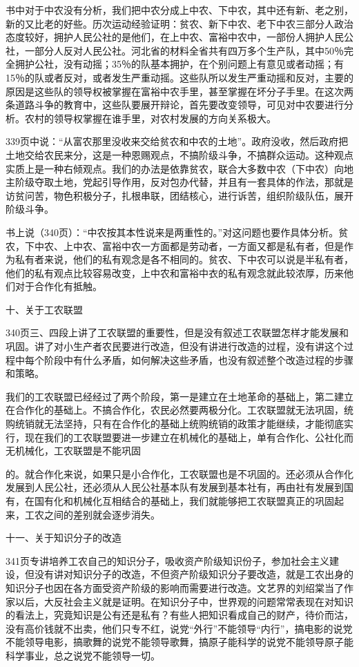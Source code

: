 书中对于中农没有分析，我们把中农分成上中农、下中农，其中还有新、老之别，新的又比老的好些。历次运动经验证明：贫农、新下中农、老下中农三部分人政治态度较好，拥护人民公社的是他们，在上中农、富裕中农中，一部份人拥护人民公社，一部分人反对人民公社。河北省的材料全省共有四万多个生产队，其中50％完全拥护公社，没有动摇；35％的队基本拥护，在个别问题上有意见或者动摇；有15％的队或者反对，或者发生严重动摇。这些队所以发生严重动摇和反对，主要的原因是这些队的领导权被掌握在富裕中农手里，甚至掌握在坏分子手里。在这次两条道路斗争的教育中，这些队要展开辩论，首先要改变领导，可见对中农要进行分析。农村的领导权掌握在谁手里，对农村发展的方向关系极大。

339页中说：“从富农那里没收来交给贫农和中农的土地”。政府没收，然后政府把土地交给农民来分，这是一种恩赐观点，不搞阶级斗争，不搞群众运动。这种观点实质上是一种右倾观点。我们的办法是依靠贫农，联合大多数中农（下中农）向地主阶级夺取土地，党起引导作用，反对包办代替，并且有一套具体的作法，那就是访贫问苦，物色积极分子，扎根串联，团结核心，进行诉苦，组织阶级队伍，展开阶级斗争。

书上说（340页）：“中农按其本性说来是两重性的。”对这问题也要作具体分析。贫农，下中农、上中农、富裕中农一方面都是劳动者，一方面又都是私有者，但是作为私有者来说，他们的私有观念是各不相同的。贫农、下中农可以说是半私有者，他们的私有观点比较容易改变，上中农和富裕中衣的私有观念就此较浓厚，历来他们对于合作化有抵触。

十、关于工农联盟

340页三、四段上讲了工农联盟的重要性，但是没有叙述工农联盟怎样才能发展和巩固。讲了对小生产者农民要进行改造，但没有讲进行改造的过程，没有讲这个过程中每个阶段中有什么矛盾，如何解决这些矛盾，也没有叙述整个改造过程的步骤和策略。

我们的工农联盟已经经过了两个阶段，第一是建立在土地革命的基础上，第二建立在合作化的基础上。不搞合作化，农民必然要两极分化。工农联盟就无法巩固，统购统销就无法坚持，只有在合作化的基础上统购统销的政策才能继续，才能彻底实行，现在我们的工农联盟要进一步建立在机械化的基础上，单有合作化、公社化而无机械化，工农联盟是不能巩固

的。就合作化来说，如果只是小合作化，工农联盟也是不巩固的。还必须从合作化发展到人民公社，还必须从人民公社基本队有发展到基本社有，再由社有发展到国有，在国有化和机械化互相结合的基础上，我们就能够把工农联盟真正的巩固起来，工农之间的差别就会逐步消失。

十一、关于知识分子的改造

341页专讲培养工农自己的知识分子，吸收资产阶级知识份子，参加社会主义建设，但没有讲对知识分子的改造，不但资产阶级知识分子要改造，就是工农出身的知识分子也因在各方面受资产阶级的影响而需要进行改造。文艺界的刘绍棠当了作家以后，大反社会主义就是证明。在知识分子中，世界观的问题常常表现在对知识的看法上，究竟知识是公有还是私有？有些人把知识看成自己的财产，待价而沽，没有高价钱就不出卖，他们只专不红，说党“外行”不能领导“内行”，搞电影的说党不能领导电影，搞歌舞的说党不能领导歌舞，搞原子能科学的说党不能领导原子能科学事业，总之说党不能领导一切。

